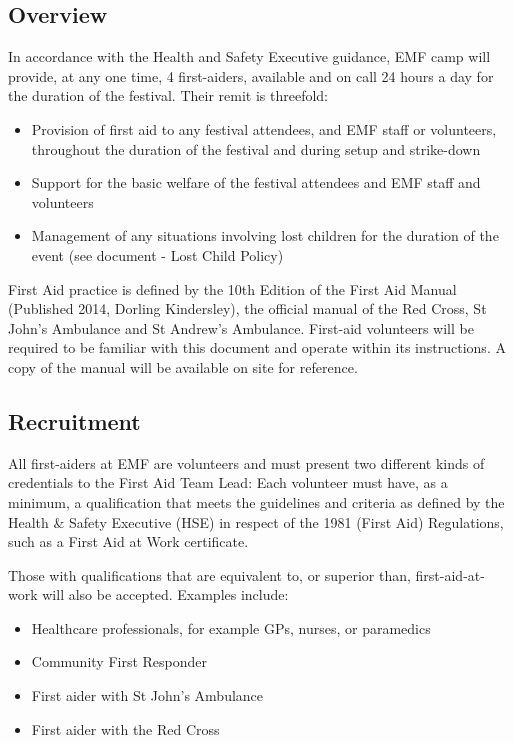 \subsection{Overview}
In accordance with the Health and Safety Executive guidance, EMF camp will
provide, at any one time, 4 first-aiders, available and on call 24 hours a day
for the duration of the festival. Their remit is threefold:

\begin{itemize}
  \item Provision of first aid to any festival attendees, and EMF staff or
  volunteers, throughout the duration of the festival and during setup and
  strike-down
  \item Support for the basic welfare of the festival attendees and EMF
  staff and volunteers
  \item Management of any situations involving lost children for the duration of
  the event (see document - Lost Child Policy)
\end{itemize}

First Aid practice is defined by the 10th Edition of the First Aid Manual
(Published 2014, Dorling Kindersley), the official manual of the Red Cross, St
John’s Ambulance and St Andrew’s Ambulance. First-aid volunteers will be
required to be familiar with this document and operate within its instructions.
A copy of the manual will be available on site for reference.

\subsection{Recruitment}
All first-aiders at EMF are volunteers and must present two different kinds of
credentials to the First Aid Team Lead: Each volunteer must have, as a minimum,
a qualification that meets the guidelines and criteria as defined by the Health
\& Safety Executive (HSE) in respect of the 1981 (First Aid) Regulations, such
as a First Aid at Work certificate.

Those with qualifications that are equivalent to, or superior than,
first-aid-at-work will also be accepted. Examples include:

\begin{itemize}
  \item Healthcare professionals, for example GPs, nurses, or paramedics
  \item Community First Responder
  \item First aider with St John’s Ambulance
  \item First aider with the Red Cross
\end{itemize}

